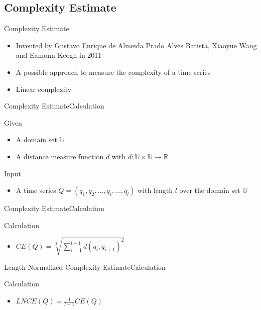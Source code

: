 \subsection{Complexity Estimate}

\begin{frame}{Complexity Estimate}
    \begin{itemize}
        \item Invented by Gustavo Enrique de Almeida Prado Alves Batista, Xiaoyue Wang and Eamonn Keogh in 2011
            \cite{batista2011complexity}
        
        \item A possible approach to measure the complexity of a time series
        
        \item Linear complexity
    \end{itemize}
\end{frame}

\begin{frame}{Complexity Estimate}{Calculation}
    \begin{block}{Given}
        \begin{itemize}
            \item A domain set $\mathbb{U}$
            
            \item A distance measure function $d$ with $d: \mathbb{U} \times \mathbb{U} \to \mathbb{R}$
            
        \end{itemize}
    \end{block}
    \begin{block}{Input}
        \begin{itemize}
            \item A time series $Q = (q_1, q_2, \dots, q_i, \dots, q_l)$ with length $l$ over the domain set
                $\mathbb{U}$
        \end{itemize}
    \end{block}
\end{frame}

\begin{frame}{Complexity Estimate}{Calculation}
    \begin{block}{Calculation}
        \begin{itemize}
            \item $CE(Q) = \sqrt[2]{\sum \limits_{i=1}^{l-1} d(q_i, q_{i + 1})^2}$
        \end{itemize}
    \end{block}
\end{frame}

\begin{frame}{Length Normalized Complexity Estimate}{Calculation}
    \begin{block}{Calculation}
        \begin{itemize}
            \item $LNCE(Q) = \frac{1}{l-1}CE(Q)$
        \end{itemize}
    \end{block}
\end{frame}
